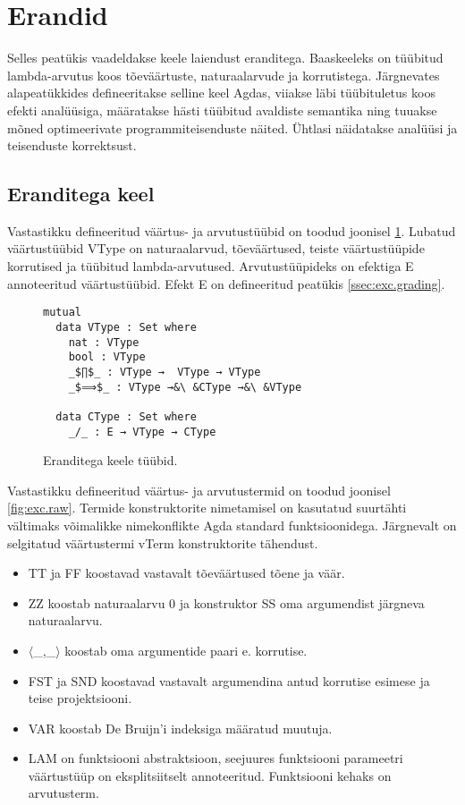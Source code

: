 \documentclass[a4paper,12pt]{article}
\begin{document}
\clearpage

\section{Erandid}

Selles peatükis vaadeldakse keele laiendust eranditega. 
Baaskeeleks on tüübitud lambda-arvutus koos tõeväärtuste, naturaalarvude ja korrutistega.
Järgnevates alapeatükkides defineeritakse selline keel Agdas,
viiakse läbi tüübituletus koos efekti analüüsiga,
määratakse hästi tüübitud avaldiste semantika
ning tuuakse mõned optimeerivate programmiteisenduste näited.
Ühtlasi näidatakse analüüsi ja teisenduste korrektsust.

\subsection{Eranditega keel}

Vastastikku defineeritud väärtus- ja arvutustüübid on toodud joonisel \ref{fig:exc.types}.
Lubatud väärtustüübid VType on naturaalarvud, tõeväärtused, teiste väärtustüüpide korrutised ja tüübitud lambda-arvutused.
Arvutustüüpideks on efektiga E annoteeritud väärtustüübid. Efekt E on defineeritud peatükis \ref{ssec:exc.grading}.
\begin{figure}
  \begin{lstlisting}
mutual
  data VType : Set where
    nat : VType
    bool : VType
    _$∏$_ : VType →  VType → VType
    _$⟹$_ : VType →&\ &CType →&\ &VType

  data CType : Set where
    _/_ : E → VType → CType
  \end{lstlisting}
  \caption{Eranditega keele tüübid.}
  \label{fig:exc.types}
\end{figure}


Vastastikku defineeritud väärtus- ja arvutustermid on toodud joonisel \ref{fig:exc.raw}.
Termide konstruktorite nimetamisel on kasutatud suurtähti vältimaks võimalikke nimekonflikte Agda standard funktsioonidega.
Järgnevalt on selgitatud väärtustermi vTerm konstruktorite tähendust.
\begin{itemize}
  \item TT ja FF koostavad vastavalt tõeväärtused tõene ja väär.
  \item ZZ koostab naturaalarvu 0 ja konstruktor SS oma argumendist järgneva naturaalarvu.
  \item $⟨$_,_$⟩$ koostab oma argumentide paari e. korrutise.
  \item FST ja SND koostavad vastavalt argumendina antud korrutise esimese ja teise projektsiooni.
  \item VAR koostab De Bruijn'i indeksiga määratud muutuja.
  \item LAM on funktsiooni abstraktsioon, seejuures funktsiooni parameetri väärtustüüp on eksplitsiitselt annoteeritud. Funktsiooni kehaks on arvutusterm.
\end{itemize}
\end{document}
